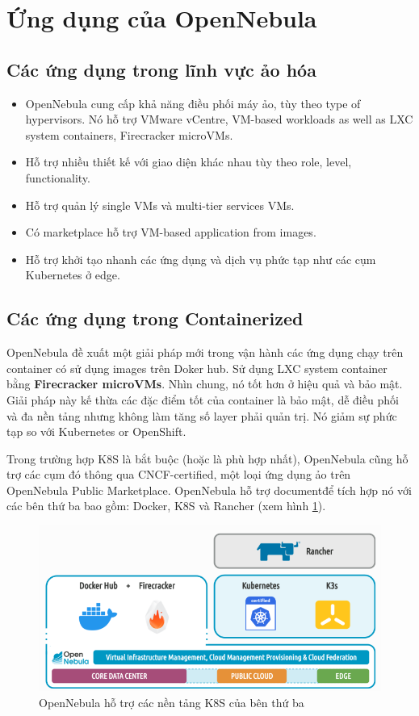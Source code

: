 \section{Ứng dụng của OpenNebula}
\subsection{Các ứng dụng trong lĩnh vực ảo hóa}
\begin{itemize}
    \item OpenNebula cung cấp khả năng điều phối máy ảo, tùy theo type of hypervisors. Nó hỗ trợ VMware vCentre, VM-based workloads as well as LXC system containers, Firecracker microVMs.
    \item Hỗ trợ nhiều thiết kế với giao diện khác nhau tùy theo role, level, functionality.
    \item Hỗ trợ quản lý single VMs và multi-tier services VMs.
    \item Có marketplace hỗ trợ VM-based application from images.
    \item Hỗ trợ khởi tạo nhanh các ứng dụng và dịch vụ phức tạp như các cụm Kubernetes ở edge.
\end{itemize}
\subsection{Các ứng dụng trong Containerized}
OpenNebula đề xuất một giải pháp mới trong vận hành các ứng dụng chạy trên container có sử dụng images trên Doker hub. Sử dụng LXC system container bằng \textbf{Firecracker microVMs}. Nhìn chung, nó tốt hơn ở hiệu quả và bảo mật. Giải pháp này kế thừa các đặc điểm tốt của container là bảo mật, dễ điều phối và đa nền tảng nhưng không làm tăng số layer phải quản trị. Nó giảm sự phức tạp so với Kubernetes or OpenShift.

Trong trường hợp K8S là bắt buộc (hoặc là phù hợp nhất), OpenNebula cũng hỗ trợ các cụm đó thông qua CNCF-certified, một loại ứng dụng ảo trên OpenNebula Public Marketplace. OpenNebula hỗ trợ document\footnotemark  để tích hợp nó với các bên thứ ba bao gồm: Docker, K8S và Rancher (xem hình \ref{fig:chap1-nebula-with-k8s}). 

\begin{figure}
    \centering
    \includegraphics*[scale=0.4]{graphics/main/overivew/chap1-nebula-with-k8s.png}
    \caption{OpenNebula hỗ trợ các nền tảng K8S của bên thứ ba}
    \label{fig:chap1-nebula-with-k8s}
\end{figure}

